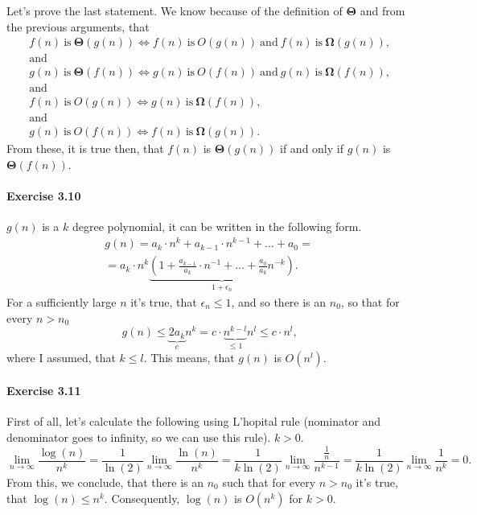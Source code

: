 \documentclass[a4paper,12pt]{article}
\newcommand{\exercise}[1]{\paragraph{Exercise #1}}
\begin{document}
    Let's prove the last statement. We know because of the definition of $\boldsymbol{\Theta}$ and from the previous arguments, that
    \begin{gather}
        \nonumber
        f(n) \ \textrm{is} \ \boldsymbol{\Theta}(g(n)) \Leftrightarrow
        f(n) \ \textrm{is} \ O(g(n)) \ \textrm{and} \ 
        f(n) \ \textrm{is} \ \boldsymbol{\Omega}(g(n)) \textrm{,}\\
        \nonumber
        \textrm{and}\\
        \nonumber
        g(n) \ \textrm{is} \ \boldsymbol{\Theta}(f(n)) \Leftrightarrow
        g(n) \ \textrm{is} \ O(f(n)) \ \textrm{and} \ 
        g(n) \ \textrm{is} \ \boldsymbol{\Omega}(f(n)) \textrm{,}\\
        \nonumber
        \textrm{and}\\
        \nonumber
        f(n) \ \textrm{is} \ O(g(n)) \Leftrightarrow g(n) \ \textrm{is} \ \boldsymbol{\Omega}(f(n)) \textrm{,}\\
        \textrm{and}\\
        g(n) \ \textrm{is} \ O(f(n)) \Leftrightarrow f(n) \ \textrm{is} \ \boldsymbol{\Omega}(g(n)) \textrm{.}
    \end{gather}
    From these, it is true then, that $f(n)$ is $\boldsymbol{\Theta}(g(n))$ if and only if $g(n)$ is $\boldsymbol{\Theta}(f(n))$.

    \exercise{3.10} $g(n)$ is a $k$ degree polynomial, it can be written in the following form.
    \begin{gather}
        \nonumber
        g(n) = a_k \cdot n^k + a_{k-1} \cdot n^{k-1} + \ldots + a_0 =\\
        = a_k \cdot n^k \underbrace{\left(1 + \frac{a_{k-1}}{a_k} \cdot n^{-1} + \ldots + \frac{a_0}{a_k} n^{-k} \right)}_{1 + \epsilon_n}
        \textrm{.}
    \end{gather}
    For a sufficiently large $n$ it's true, that $\epsilon_n \leq 1$, and so there is an $n_0$, so that for every $n > n_0$
    \begin{equation}
        g(n) \leq \underbrace{2 a_k}_c n^k = c \cdot \underbrace{n^{k-l}}_{\leq 1} n^l \leq c \cdot n^l \textrm{,}
    \end{equation}
    where I assumed, that $k \leq l$. This means, that $g(n)$ is $O(n^l)$.

    \exercise{3.11} \cite{1663823} First of all, let's calculate the following using L'hopital rule (nominator and denominator goes to infinity, so we can use this rule). $k > 0$.
    \begin{equation}
        \lim_{n \to \infty} \frac{\log(n)}{n^k} = \frac{1}{\ln(2)} \lim_{n \to \infty} \frac{\ln(n)}{n^k} =
        \frac{1}{k\ln(2)} \lim_{n \to \infty} \frac{ \frac{1}{n} }{ n^{k-1} } = 
        \frac{1}{k\ln(2)} \lim_{n \to \infty} \frac{1}{ n^k } = 0 \textrm{.}
    \end{equation}
    From this, we conclude, that there is an $n_0$ such that for every $n > n_0$ it's true, that $\log(n) \leq n^k$. Consequently, $\log(n)$ is $O(n^k)$ for $k > 0$.
\end{document}
